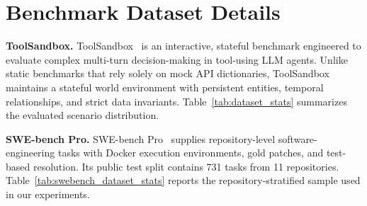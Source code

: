 \section{Benchmark Dataset Details}
\label{app:dataset_stats}

\textbf{ToolSandbox.} ToolSandbox~\citep{gu2024toolsandbox} is an interactive, stateful benchmark engineered to evaluate complex multi-turn decision-making in tool-using LLM agents. Unlike static benchmarks that rely solely on mock API dictionaries, ToolSandbox maintains a stateful world environment with persistent entities, temporal relationships, and strict data invariants. Table~\ref{tab:dataset_stats} summarizes the evaluated scenario distribution.



\textbf{SWE-bench Pro.} SWE-bench Pro~\citep{deng2025swebenchpro} supplies repository-level software-engineering tasks with Docker execution environments, gold patches, and test-based resolution. Its public test split contains 731 tasks from 11 repositories. Table~\ref{tab:swebench_dataset_stats} reports the repository-stratified sample used in our experiments.


